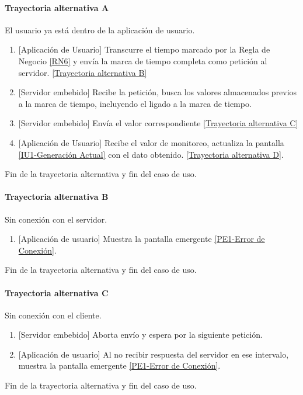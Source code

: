 \paragraph{Trayectoria alternativa A} \label{SUB-U-CU1.2:TA}
	El usuario ya está dentro de la aplicación de usuario.
	\begin{enumerate}[label=A\arabic*.]
		\item {[Aplicación de Usuario]} Transcurre el tiempo marcado por la Regla de Negocio \ref{RN6} y envía la marca de tiempo completa como petición al servidor. \hyperref[SUB-U-CU1.2:TB]{[Trayectoria alternativa B]} 
		\item {[Servidor embebido]} Recibe la petición, busca los valores almacenados previos a la marca de tiempo, incluyendo el ligado a la marca de tiempo.
		\item  {[Servidor embebido]} Envía el valor correspondiente \hyperref[SUB-U-CU1.2:TC]{[Trayectoria alternativa C]}
        \item {[Aplicación de Usuario]} Recibe el valor de monitoreo, actualiza la pantalla \hyperref[fig:monitoreo]{[IU1-Generación Actual]} con el dato obtenido.
        \hyperref[SUB-U-CU1.2:TD]{[Trayectoria alternativa D]}.
	\end{enumerate}
	Fin de la trayectoria alternativa y fin del caso de uso.

\paragraph{Trayectoria alternativa B} \label{SUB-U-CU1.2:TB}
	Sin conexión con el servidor.
	\begin{enumerate}[label=B\arabic*.]
		\item {[Aplicación de usuario]} Muestra la pantalla emergente \hyperref[fig:Error de Conexion]{[PE1-Error de Conexión]}.
	\end{enumerate}
	Fin de la trayectoria alternativa y fin del caso de uso.


\paragraph{Trayectoria alternativa C} \label{SUB-U-CU1.2:TC}
	Sin conexión con el cliente.
	\begin{enumerate}[label=C\arabic*.]
		\item {[Servidor embebido]} Aborta envío y espera por la siguiente petición.
		\item {[Aplicación de usuario]} Al no recibir respuesta del servidor en ese intervalo, muestra la pantalla emergente \hyperref[fig:Error de Conexion]{[PE1-Error de Conexión]}.
	\end{enumerate}
	Fin de la trayectoria alternativa y fin del caso de uso.
	
